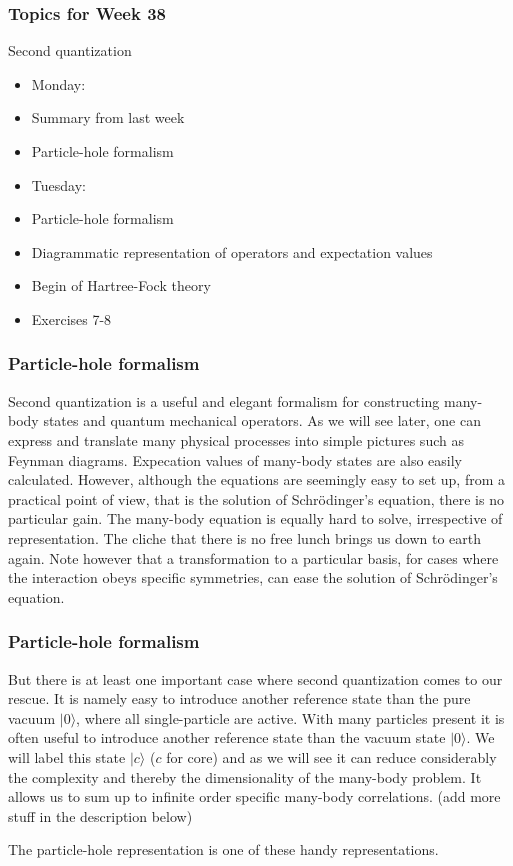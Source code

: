 \documentclass[compress]{beamer}
\newcommand*{\ket}[1]{|#1\rangle}
\begin{document}
\frame
{
  \frametitle{Topics for Week 38}
  \begin{block}{Second quantization}
\begin{itemize}
\item Monday:
\item Summary from last week
\item Particle-hole formalism
\item Tuesday:
\item Particle-hole formalism
\item Diagrammatic representation of operators and expectation values
\item Begin of Hartree-Fock theory
\item Exercises 7-8
\end{itemize}
  \end{block}
} 




\frame
{
  \frametitle{Particle-hole formalism}
\begin{small}
{\scriptsize
Second quantization is a useful and elegant formalism  for constructing many-body  states and 
quantum mechanical operators. As we will see later, one can express and translate many physical processes
into simple pictures such as Feynman diagrams. Expecation values of many-body states are also easily calculated.
However, although the equations are seemingly easy to set up, from  a practical point of view, that is
the solution of Schr\"odinger's equation, there is no particular gain.
The many-body equation is equally hard to solve, irrespective of representation. 
The cliche that 
there is no free lunch brings us down to earth again.  
Note however that a transformation to a particular
basis, for cases where the interaction obeys specific symmetries, can ease the solution of Schr\"odinger's equation. 
}
\end{small}
}


\frame
{
  \frametitle{Particle-hole formalism}
\begin{small}
{\scriptsize
But there is at least one important case where second quantization comes to our rescue.
It is namely easy to introduce another reference state than the pure vacuum $\ket{0}$, where all single-particle
are active.
With many particles present it is often useful to introduce another reference state  than the vacuum state 
$\ket{0}$. We will label this state $\ket{c}$ ($c$ for core) and as we will see it can reduce 
considerably the complexity and thereby the dimensionality of the many-body problem. It allows us to sum up to infinite order
specific many-body correlations. (add more stuff in the description below)

The particle-hole representation is one of these handy representations. 
}
\end{small}
}
\end{document}
